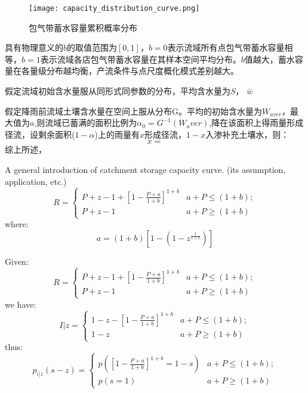  
\begin{figure}[H]
\centering
\texttt{[image: capacity\_distribution\_curve.png]}
\caption{包气带蓄水容量累积概率分布}
\end{figure}

具有物理意义的$b$的取值范围为$[0,1]$，$b=0$表示流域所有点包气带蓄水容量相等，$b=1$表示流域各店包气带蓄水容量在其样本空间平均分布。$b$值越大，蓄水容量在各量级分布越均衡，产流条件与点尺度概化模式差别越大。


假定流域初始含水量服从同形式同参数的分布，平均含水量为$S$， $\bar{w}$




假定降雨前流域土壤含水量在空间上服从分布G。平均的初始含水量为$W_{aver}$，最大值为$a$,则流域已蓄满的面积比例为$\alpha_0 =G^{-1}(W_aver)$,降在该面积上得雨量形成径流，设剩余面积($1-\alpha$)上的雨量有$x$形成径流，$1-x$入渗补充土壤水，则：
\begin{equation}
x=
\end{equation}
综上所述，

A general introduction of catchment storage capacity curve. (its assumption, application, etc.)
\begin{equation}
R=
 \begin{cases}
 P+z-1+[1-\frac{P+a}{1+b}]^{1+b}&{a+P\leq (1+b)};\\P+z-1 &{a+P\geq (1+b)}
 \end{cases}
\end{equation}
where:
\begin{equation}
a=(1+b)[1-(1-z^{\frac{1}{1+b}})]
\end{equation}

Given:
\begin{equation}
R=
 \begin{cases}
 P+z-1+[1-\frac{P+a}{1+b}]^{1+b}&{a+P\leq (1+b)};\\P+z-1 &{a+P\geq (1+b)}
 \end{cases}
\end{equation}
we have:
\begin{equation}
I\vert z=
 \begin{cases}
 1-z-[1-\frac{P+a}{1+b}]^{1+b}&{a+P\leq (1+b)};\\1-z &{a+P\geq (1+b)}
 \end{cases}
\end{equation}
thus:
\begin{equation}
p_{i|z}(s-z)=
 \begin{cases}
 p([1-\frac{P+a}{1+b}]^{1+b}=1-s)&{a+P\leq (1+b)};\\p(s=1) &{a+P\geq (1+b)}
 \end{cases}
\end{equation}

